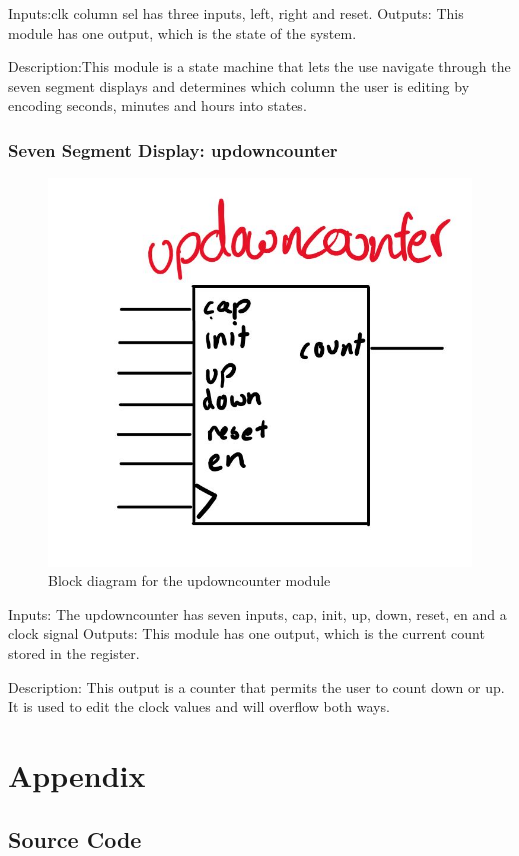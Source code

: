 \documentclass[a4paper]{article}
\begin{document}
Inputs:clk column sel has three inputs, left, right and reset. 
Outputs: This module has one output, which is the state of the system. 

Description:This module is a state machine that lets the use navigate through the seven segment displays and determines which column the user is editing by encoding seconds, minutes and hours into states. 

\subsubsection{Seven Segment Display: updowncounter}
\begin{figure}[H]
    \includegraphics[width=0.8 \linewidth]{images/updowncounter.JPG}
    \caption{Block diagram for the updowncounter module}
    \label{updowncounter}
\end{figure}

Inputs: The updowncounter has seven inputs, cap, init, up, down, reset, en and a clock signal
Outputs: This module has one output, which is the current count stored in the register.

Description: This output is a counter that permits the user to count down or up. It is used to edit the clock values and will overflow both ways.

\section{Appendix}

\subsection{Source Code}%
\end{document}
